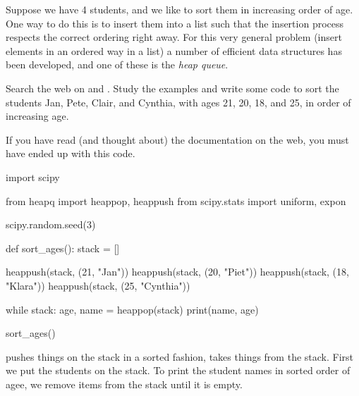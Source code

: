 Suppose we have 4 students, and we like to sort them in increasing order of age.
One way to do this is to insert them into a list such that the insertion process respects the correct ordering right away.
For this very general problem (insert elements in an ordered way in a list) a number of efficient data structures has been developed, and one of these is the \emph{heap queue}.

\begin{exercise}
  Search the web on  and .
  Study the examples and write some code to sort the students Jan, Pete, Clair, and Cynthia, with ages 21, 20, 18, and 25, in order of increasing age.

\begin{solution}
  If you have read (and thought about) the documentation on the web, you must have ended up with this code.
\begin{pyverbatim}
import scipy

from heapq import heappop, heappush
from scipy.stats import uniform, expon

scipy.random.seed(3)


def sort_ages():
    stack = []

    heappush(stack, (21, "Jan"))
    heappush(stack, (20, "Piet"))
    heappush(stack, (18, "Klara"))
    heappush(stack, (25, "Cynthia"))

    while stack:
        age, name = heappop(stack)
        print(name, age)


sort_ages()
  \end{pyverbatim}

   pushes things on the stack in a sorted fashion,  takes things from the stack.
  First we put the students on the stack.
  To print the student names in sorted order of agee, we remove items from the stack until it is empty.
\end{solution}

\end{exercise}



